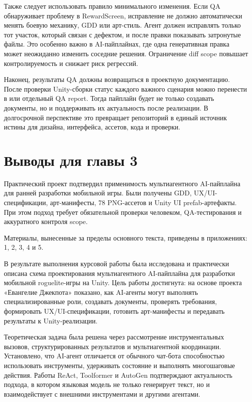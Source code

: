 \documentclass[a4paper,12pt]{report}
\newcommand{\file}[1]{\path{#1}}
\begin{document}
Также следует использовать правило минимального изменения. Если QA обнаруживает проблему в RewardScreen, исправление не должно автоматически менять боевую механику, GDD или арт-стиль. Агент должен исправлять только тот участок, который связан с дефектом, и после правки показывать затронутые файлы. Это особенно важно в AI-пайплайнах, где одна генеративная правка может неожиданно изменить соседние решения. Ограничение diff scope повышает контролируемость и снижает риск регрессий.

Наконец, результаты QA должны возвращаться в проектную документацию. После проверки Unity-сборки статус каждого важного сценария можно перенести в \file{STATUS.md} или отдельный QA report. Тогда пайплайн будет не только создавать документы, но и поддерживать их актуальность после реализации. В долгосрочной перспективе это превращает репозиторий в единый источник истины для дизайна, интерфейса, ассетов, кода и проверки.

\section{Выводы для главы 3}

Практический проект подтвердил применимость мультиагентного AI-пайплайна для ранней разработки мобильной игры. Были получены GDD, UX/UI-спецификации, арт-манифесты, 78 PNG-ассетов и Unity UI prefab-артефакты. При этом подход требует обязательной проверки человеком, QA-тестирования и аккуратного контроля scope.

Материалы, вынесенные за пределы основного текста, приведены в приложениях: 1, 2, 3, 4 и 5.

\finalConclusionChapter

В результате выполнения курсовой работы была исследована и практически описана схема проектирования мультиагентного AI-пайплайна для разработки мобильной roguelite-игры на Unity. Цель работы достигнута: на основе проекта «Евангелие Джекпота» показано, как AI-агенты могут выполнять специализированные роли, создавать документы, проверять требования, формировать UX/UI-спецификации, готовить арт-манифесты и передавать результаты к Unity-реализации.

Теоретическая задача была решена через рассмотрение инструментальных вызовов, структурированных результатов и мультиагентной координации. Установлено, что AI-агент отличается от обычного чат-бота способностью использовать инструменты, удерживать состояние и выполнять многошаговые действия. Работы ReAct, Toolformer и AutoGen подтверждают актуальность подхода, в котором языковая модель не только генерирует текст, но и взаимодействует с внешними инструментами и другими агентами.
\end{document}
